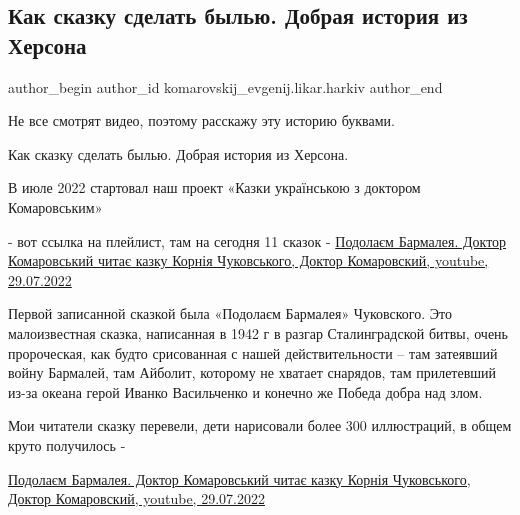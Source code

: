  
 
 
 
 

\subsection{Как сказку сделать былью. Добрая история из Херсона}
\label{sec:25_01_2023.fb.komarovskij_evgenij.likar.harkiv.1.kak_skazku_sdelat_bi}

\ifcmt
 author_begin
   author_id komarovskij_evgenij.likar.harkiv
 author_end
\fi

Не все смотрят видео, поэтому расскажу эту историю буквами.

Как сказку сделать былью. Добрая история из Херсона. 

В июле 2022 стартовал наш проект «Казки українською з доктором Комаровським» 

- вот ссылка на плейлист, там на сегодня 11 сказок -
\href{https://www.youtube.com/watch?v=oKe31ZLlA6s}{Подолаєм Бармалея. Доктор Комаровський читає казку Корнія Чуковського, %
Доктор Комаровский, youtube, 29.07.2022%
}


Первой записанной сказкой была «Подолаєм Бармалея» Чуковского. Это
малоизвестная сказка, написанная в 1942 г в разгар Сталинградской битвы, очень
пророческая, как будто срисованная с нашей действительности – там затеявший
войну Бармалей, там Айболит, которому не хватает снарядов, там прилетевший
из-за океана герой Иванко Васильченко и конечно же Победа добра над злом. 

Мои читатели сказку перевели, дети нарисовали более 300 иллюстраций, в общем
круто получилось - 

\href{https://www.youtube.com/watch?v=oKe31ZLlA6s}{%
Подолаєм Бармалея. Доктор Комаровський читає казку Корнія Чуковського, %
Доктор Комаровский, youtube, 29.07.2022%
}

